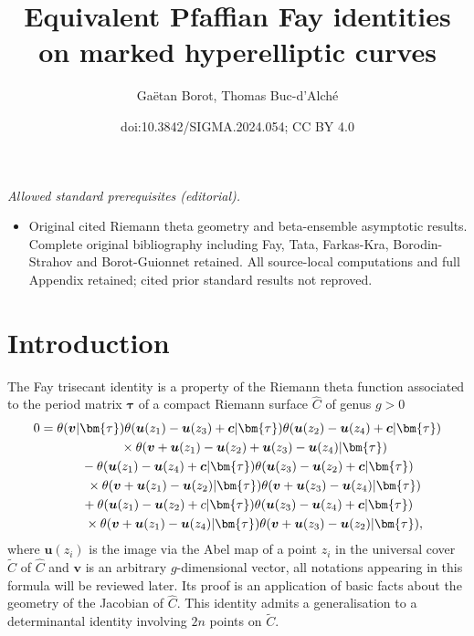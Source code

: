 \documentclass[10pt,a4paper]{amsart}
\title{Equivalent Pfaffian Fay identities on marked hyperelliptic curves}
\author{Gaëtan Borot, Thomas Buc-d'Alché}
\date{doi:10.3842/SIGMA.2024.054; CC BY 4.0}
\numberwithin{equation}{section}
\begin{document}
\maketitle
\noindent\textit{Allowed standard prerequisites (editorial).}\begin{itemize}
\item Original cited Riemann theta geometry and beta-ensemble asymptotic results. Complete original bibliography including Fay, Tata, Farkas-Kra, Borodin-Strahov and Borot-Guionnet retained. All source-local computations and full Appendix retained; cited prior standard results not reproved.
\end{itemize}\medskip
\section{Introduction}

The Fay trisecant identity \cite{Fay} is a property of the Riemann theta function associated to the period matrix $\bm{\tau}$ of a compact Riemann surface $\widehat{C}$ of genus $g > 0$
\begin{gather}
0 = \theta(\boldsymbol{v}|\bm{\tau}) \theta (\boldsymbol{u}(z_1) - \boldsymbol{u}(z_3) + \boldsymbol{c} |\bm{\tau} )\theta (\boldsymbol{u}(z_2) - \boldsymbol{u}(z_4) + \boldsymbol{c} |\bm{\tau} ) \nonumber\\
\hphantom{0=}\quad{}
\times \theta (\boldsymbol{v} + \boldsymbol{u}(z_1) - \boldsymbol{u}(z_2) + \boldsymbol{u}(z_3) - \boldsymbol{u}(z_4) |\bm{\tau} ) \nonumber\\
\hphantom{0=}{} - \theta(\boldsymbol{u}(z_1) - \boldsymbol{u}(z_4) + \boldsymbol{c} |\bm{\tau} )\theta (\boldsymbol{u}(z_3) - \boldsymbol{u}(z_2) + \boldsymbol{c} |\bm{\tau} )\nonumber\\
\hphantom{0=}\quad {}\times\theta (\boldsymbol{v} + \boldsymbol{u}(z_1) - \boldsymbol{u}(z_2) |\bm{\tau} )\theta (\boldsymbol{v} + \boldsymbol{u}(z_3) - \boldsymbol{u}(z_4) |\bm{\tau} ) \nonumber\\
\hphantom{0=}{}+ \theta (\boldsymbol{u}(z_1) - \boldsymbol{u}(z_2) + c |\bm{\tau} )\theta (\boldsymbol{u}(z_3) - \boldsymbol{u}(z_4) + \boldsymbol{c} |\bm{\tau} ) \nonumber\\
\hphantom{0=}\quad {}\times \theta (\boldsymbol{v} + \boldsymbol{u}(z_1) - \boldsymbol{u}(z_4) |\bm{\tau} )\theta (\boldsymbol{v} + \boldsymbol{u}(z_3) - \boldsymbol{u}(z_2) |\bm{\tau} ) ,\label{Fayid}
\end{gather}
where $\boldsymbol{u}(z_i)$ is the image via the Abel map of a point $z_i$ in the universal cover $\widetilde{C}$ of $\widehat{C}$ and $\boldsymbol{v}$ is an arbitrary $g$-dimensional vector, all notations appearing in this formula will be reviewed later. Its proof is an application of basic facts about the geometry of the Jacobian of $\widehat{C}$. This identity admits a generalisation to a determinantal identity involving $2n$ points on $\widetilde{C}$.
\end{document}
